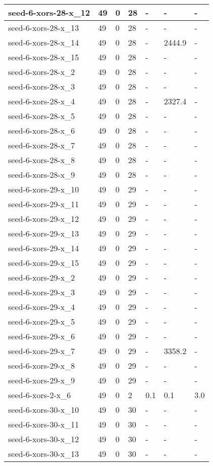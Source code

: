 \begin{scriptsize}
\begin{longtable}{|p{5cm}|l|l|l|l|l|l|}
seed-6-xors-28-x\_12&49&0&28&-&-&- \\ \hline 
seed-6-xors-28-x\_13&49&0&28&-&-&- \\ \hline 
seed-6-xors-28-x\_14&49&0&28&-&2444.9&- \\ \hline 
seed-6-xors-28-x\_15&49&0&28&-&-&- \\ \hline 
seed-6-xors-28-x\_2&49&0&28&-&-&- \\ \hline 
seed-6-xors-28-x\_3&49&0&28&-&-&- \\ \hline 
seed-6-xors-28-x\_4&49&0&28&-&2327.4&- \\ \hline 
seed-6-xors-28-x\_5&49&0&28&-&-&- \\ \hline 
seed-6-xors-28-x\_6&49&0&28&-&-&- \\ \hline 
seed-6-xors-28-x\_7&49&0&28&-&-&- \\ \hline 
seed-6-xors-28-x\_8&49&0&28&-&-&- \\ \hline 
seed-6-xors-28-x\_9&49&0&28&-&-&- \\ \hline 
seed-6-xors-29-x\_10&49&0&29&-&-&- \\ \hline 
seed-6-xors-29-x\_11&49&0&29&-&-&- \\ \hline 
seed-6-xors-29-x\_12&49&0&29&-&-&- \\ \hline 
seed-6-xors-29-x\_13&49&0&29&-&-&- \\ \hline 
seed-6-xors-29-x\_14&49&0&29&-&-&- \\ \hline 
seed-6-xors-29-x\_15&49&0&29&-&-&- \\ \hline 
seed-6-xors-29-x\_2&49&0&29&-&-&- \\ \hline 
seed-6-xors-29-x\_3&49&0&29&-&-&- \\ \hline 
seed-6-xors-29-x\_4&49&0&29&-&-&- \\ \hline 
seed-6-xors-29-x\_5&49&0&29&-&-&- \\ \hline 
seed-6-xors-29-x\_6&49&0&29&-&-&- \\ \hline 
seed-6-xors-29-x\_7&49&0&29&-&3358.2&- \\ \hline 
seed-6-xors-29-x\_8&49&0&29&-&-&- \\ \hline 
seed-6-xors-29-x\_9&49&0&29&-&-&- \\ \hline 
seed-6-xors-2-x\_6&49&0&2&0.1&0.1&3.0 \\ \hline 
seed-6-xors-30-x\_10&49&0&30&-&-&- \\ \hline 
seed-6-xors-30-x\_11&49&0&30&-&-&- \\ \hline 
seed-6-xors-30-x\_12&49&0&30&-&-&- \\ \hline 
seed-6-xors-30-x\_13&49&0&30&-&-&- \\ \hline 

\end{longtable}
\end{scriptsize}
